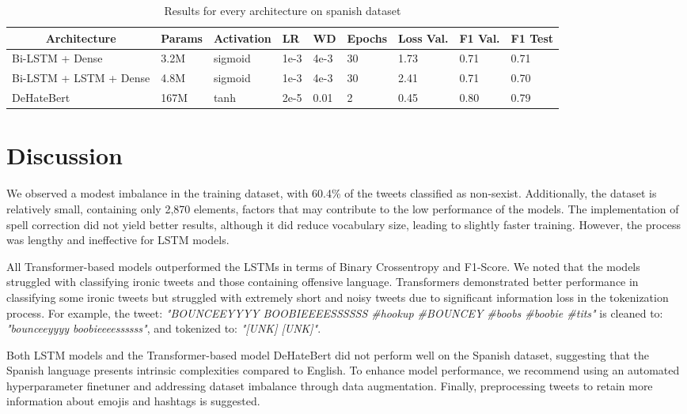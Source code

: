 \documentclass[11pt]{article}
\begin{document}
\begin{table*}[!t]
\begin{tabular}{l|l|l|l|l|l|l|l|l}
\multicolumn{1}{c|}{\textbf{Architecture}} & \textbf{Params} & \textbf{Activation} & \textbf{LR} & \textbf{WD} & \textbf{Epochs} & \textbf{Loss Val.} & \textbf{F1 Val.} & \multicolumn{1}{c}{\textbf{F1 Test}} \\ \hline

Bi-LSTM + Dense		& 	3.2M	& sigmoid		& 1e-3	& 4e-3 	& 30 & 1.73 &	0.71 & 0.71 \\
Bi-LSTM + LSTM + Dense	& 		4.8M	& sigmoid		& 1e-3	& 4e-3	& 30 & 2.41 & 0.71 & 0.70\\
DeHateBert	&   167M	& tanh	& 2e-5	& 0.01	& 	2 & 0.45 &  0.80 & 0.79

\end{tabular}
\caption{Results for every architecture on spanish dataset}
\end{table*}




\section{Discussion}
\label{sec:discussion}
We observed a modest imbalance in the training dataset, with 60.4\% of the tweets classified as non-sexist. Additionally, the dataset is relatively small, containing only 2,870 elements, factors that may contribute to the low performance of the models. The implementation of spell correction did not yield better results, although it did reduce vocabulary size, leading to slightly faster training. However, the process was lengthy and ineffective for LSTM models.

All Transformer-based models outperformed the LSTMs in terms of Binary Crossentropy and F1-Score. We noted that the models struggled with classifying ironic tweets and those containing offensive language. Transformers demonstrated better performance in classifying some ironic tweets but struggled with extremely short and noisy tweets due to significant information loss in the tokenization process. For example, the tweet: \textit{"BOUNCEEYYYY BOOBIEEEESSSSSS \#hookup \#BOUNCEY \#boobs \#boobie \#tits"} is cleaned to: \textit{"bounceeyyyy boobieeeessssss"}, and tokenized to: \textit{"[UNK] [UNK]"}.

Both LSTM models and the Transformer-based model DeHateBert did not perform well on the Spanish dataset, suggesting that the Spanish language presents intrinsic complexities compared to English. To enhance model performance, we recommend using an automated hyperparameter finetuner and addressing dataset imbalance through data augmentation. Finally, preprocessing tweets to retain more information about emojis and hashtags is suggested.
\end{document}
